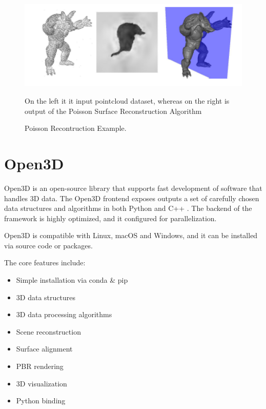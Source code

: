 \documentclass[12pt]{report}
\begin{document}
\begin{figure}[H]%
  \centering
  \includegraphics[width=1\textwidth]{poisson_example.png}
 \caption{Poisson Recontruction Example.} On the left it it input pointcloud dataset, whereas on the right is output of the Poisson Surface Reconstruction Algorithm\cite[]{Poisson}
 \label{fig:Poisson_def} 
\end{figure}




\section{Open3D}
\label{section:Open3D}
Open3D is an open-source library that supports fast development of software that handles 3D data.
The Open3D frontend exposes outputs a set of carefully chosen data structures and algorithms in both Python and C++ . 
The backend of the framework is highly optimized, and it configured for parallelization.

Open3D is compatible with Linux, macOS and Windows, and it can be installed via source code or packages. 

The core features include: 
\begin{multicols}{2}
  \begin{itemize}
    \itemsep0em 
    \item Simple installation via conda \& pip
    \item 3D data structures
    \item 3D data processing algorithms
    \item Scene reconstruction
    \item Surface alignment
    \item PBR rendering
    \item 3D visualization
    \item Python binding
  \end{itemize}
  \end{multicols}
\end{document}
